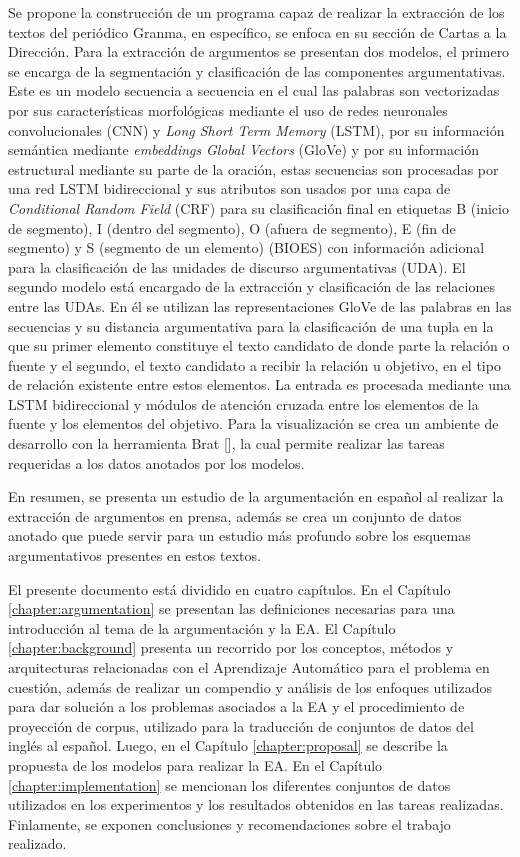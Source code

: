 Se propone la construcción de un programa capaz de realizar la extracción de los textos del periódico Granma, 
en específico, se enfoca en su sección de Cartas a la Dirección. Para la extracción
de argumentos se presentan dos modelos, el primero se encarga de la segmentación y clasificación
de las componentes argumentativas. Este es un modelo secuencia a secuencia en el cual las palabras 
son vectorizadas por sus características morfológicas mediante el uso de redes neuronales convolucionales
(CNN) y \emph{Long Short Term Memory} (LSTM), por su información
semántica mediante \emph{embeddings} \emph{Global Vectors} (GloVe) y por su información 
estructural mediante su parte de la oración, estas 
secuencias son procesadas por una red LSTM bidireccional y sus atributos son usados por una capa 
de \emph{Conditional Random Field} (CRF) 
para su clasificación final en etiquetas B (inicio de segmento), I (dentro del segmento), O (afuera de segmento), 
E (fin de segmento) y S (segmento de un elemento) (BIOES) con información adicional para la clasificación de las 
unidades de discurso argumentativas (UDA). El segundo modelo está encargado de la extracción y clasificación 
de las relaciones entre las UDAs. En él se utilizan las representaciones GloVe de las palabras en las secuencias 
y su distancia argumentativa para la clasificación de una tupla en la que su primer elemento 
constituye el texto candidato de donde parte la relación o fuente y el segundo, el texto candidato a recibir la 
relación u objetivo, en el tipo de relación existente entre estos elementos. La entrada es procesada mediante 
una LSTM bidireccional y módulos de atención cruzada entre los elementos de la fuente y los elementos del objetivo.
Para la visualización se crea un ambiente de desarrollo con la herramienta Brat [\cite{brat}], la cual permite realizar las 
tareas requeridas a los datos anotados por los modelos.

En resumen, se presenta un estudio de la argumentación en español al realizar la extracción de 
argumentos en prensa, además se crea un conjunto de datos anotado que puede servir
para un estudio más profundo sobre los esquemas argumentativos presentes en estos textos. 


El presente documento está dividido en cuatro capítulos.
En el Capítulo \ref{chapter:argumentation} se presentan las definiciones necesarias para una introducción
al tema de la argumentación y la EA.
El Capítulo \ref{chapter:background} presenta un recorrido por los 
conceptos, métodos y arquitecturas relacionadas con el Aprendizaje Automático para el problema 
en cuestión, además de realizar un compendio y análisis de los enfoques utilizados para dar solución
a los problemas asociados a la EA y el procedimiento de proyección de corpus, utilizado para la 
traducción de conjuntos de datos del inglés al español. 
Luego, en el Capítulo \ref{chapter:proposal}
se describe la propuesta de los modelos para realizar la EA.
En el Capítulo \ref{chapter:implementation} se mencionan los diferentes conjuntos de datos utilizados 
en los experimentos y los resultados obtenidos en las tareas realizadas.
Finlamente, se exponen conclusiones y recomendaciones sobre el trabajo 
realizado.
